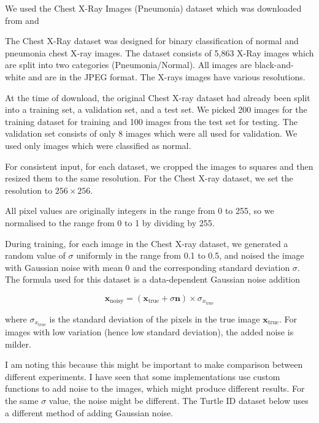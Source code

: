 \documentclass[12pt]{article}
\begin{document}
We used the Chest X-Ray Images (Pneumonia) dataset which was downloaded from \cite{kermany2018large} and 


The Chest X-Ray dataset was designed for binary classification of normal and pneumonia chest X-ray images. 
The dataset consists of 5,863 X-Ray images which are split into two categories (Pneumonia/Normal).
All images are black-and-white and are in the JPEG format.
The X-rays images have various resolutions.



At the time of download, the original Chest X-ray dataset had already been split into a training set, a validation set, and a test set.
We picked 200 images for the training dataset for training and 100 images from the test set for testing. The validation set consists of only 8 images which were all used for validation.
We used only images which were classified as normal.

 

For consistent input, for each dataset, we cropped the images to squares and then resized them to the same resolution.
For the Chest X-ray dataset, we set the resolution to $256 \times 256$.

All pixel values are originally integers in the range from 0 to 255, so we normalised to the range from 0 to 1 by dividing by 255.


During training, for each image in the Chest X-ray dataset, we generated a random value of $\sigma$ uniformly in the range from 0.1 to 0.5, and noised the image with Gaussian noise with mean 0 and the corresponding standard deviation $\sigma$.
The formula used for this dataset is a data-dependent Gaussian noise addition

\begin{equation}
    \mathbf{x}_{\text{noisy}} = (\mathbf{x}_{\text{true}} + \sigma \mathbf{n}) \times \sigma_{x_{\text{true}}}
\end{equation}

where $\sigma_{x_{\text{true}}}$ is the standard deviation of the pixels in the true image $\mathbf{x}_{\text{true}}$.
For images with low variation (hence low standard deviation), the added noise is milder.

I am noting this because this might be important to make comparison between different experiments.
I have seen that some implementations use custom functions to add noise to the images, 
which might produce different results.
For the same $\sigma$ value, the noise might be different.
The Turtle ID dataset below uses a different method of adding Gaussian noise.
\end{document}
